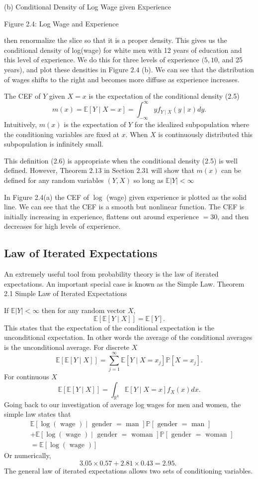 \documentclass[10pt]{article}
\begin{document}
(b) Conditional Density of Log Wage given Experience

Figure 2.4: Log Wage and Experience

then renormalize the slice so that it is a proper density. This gives us the conditional density of log(wage) for white men with 12 years of education and this level of experience. We do this for three levels of experience $(5,10$, and 25 years), and plot these densities in Figure $2.4$ (b). We can see that the distribution of wages shifts to the right and becomes more diffuse as experience increases.

The CEF of $Y$ given $X=x$ is the expectation of the conditional density (2.5)
$$
m(x)=\mathbb{E}[Y \mid X=x]=\int_{-\infty}^{\infty} y f_{Y \mid X}(y \mid x) d y .
$$
Intuitively, $m(x)$ is the expectation of $Y$ for the idealized subpopulation where the conditioning variables are fixed at $x$. When $X$ is continuously distributed this subpopulation is infinitely small.

This definition (2.6) is appropriate when the conditional density (2.5) is well defined. However, Theorem $2.13$ in Section $2.31$ will show that $m(x)$ can be defined for any random variables $(Y, X)$ so long as $\mathbb{E}|Y|<\infty$

In Figure 2.4(a) the CEF of $\log$ (wage) given experience is plotted as the solid line. We can see that the CEF is a smooth but nonlinear function. The CEF is initially increasing in experience, flattens out around experience $=30$, and then decreases for high levels of experience.

\subsection{Law of Iterated Expectations}
An extremely useful tool from probability theory is the law of iterated expectations. An important special case is known as the Simple Law. Theorem 2.1 Simple Law of Iterated Expectations

If $\mathbb{E}|Y|<\infty$ then for any random vector $X$,
$$
\mathbb{E}[\mathbb{E}[Y \mid X]]=\mathbb{E}[Y] .
$$
This states that the expectation of the conditional expectation is the unconditional expectation. In other words the average of the conditional averages is the unconditional average. For discrete $X$
$$
\mathbb{E}[\mathbb{E}[Y \mid X]]=\sum_{j=1}^{\infty} \mathbb{E}\left[Y \mid X=x_{j}\right] \mathbb{P}\left[X=x_{j}\right] .
$$
For continuous $X$
$$
\mathbb{E}[\mathbb{E}[Y \mid X]]=\int_{\mathbb{R}^{k}} \mathbb{E}[Y \mid X=x] f_{X}(x) d x .
$$
Going back to our investigation of average log wages for men and women, the simple law states that
$$
\begin{aligned}
&\mathbb{E}[\log (\text { wage }) \mid \text { gender }=\text { man }] \mathbb{P}[\text { gender }=\text { man }] \\
&+\mathbb{E}[\log (\text { wage }) \mid \text { gender }=\text { woman }] \mathbb{P}[\text { gender }=\text { woman }] \\
&=\mathbb{E}[\log (\text { wage })]
\end{aligned}
$$
Or numerically,
$$
3.05 \times 0.57+2.81 \times 0.43=2.95 \text {. }
$$
The general law of iterated expectations allows two sets of conditioning variables.
\end{document}
